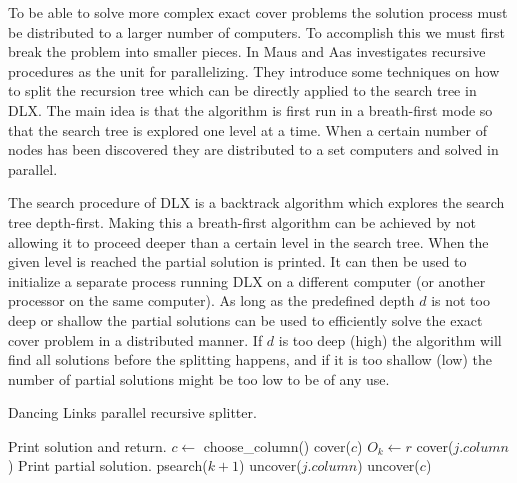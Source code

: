 To be able to solve more complex exact cover problems the solution process must be distributed to a larger number of computers.
To accomplish this we must first break the problem into smaller pieces.
In \cite{maus-prp} Maus and Aas investigates recursive procedures as the unit for parallelizing.
They introduce some techniques on how to split the recursion tree which can be directly applied to the search tree in DLX.
The main idea is that the algorithm is first run in a breath-first mode so that the search tree is explored one level at a time.
When a certain number of nodes has been discovered they are distributed to a set computers and solved in parallel.

The search procedure of DLX is a backtrack algorithm which explores the search tree depth-first.
Making this a breath-first algorithm can be achieved by not allowing it to proceed deeper than a certain level in the search tree.
When the given level is reached the partial solution is printed.
It can then be used to initialize a separate process running DLX on a different computer (or another processor on the same computer).
As long as the predefined depth $d$ is not too deep or shallow the partial solutions can be used to efficiently solve the exact cover problem in a distributed manner.
If $d$ is too deep (high) the algorithm will find all solutions before the splitting happens, and if it is too shallow (low) the number of partial solutions might be too low to be of any use.
\begin{algorithm}[H]
	\caption{Dancing Links parallel recursive splitter.}
	\label{dlx_dsearch}
	\begin{distribalgo}[1]
				\STATE Print solution and return.  
			\ENDIF
			\STATE $c \leftarrow$ choose\_column()
			\STATE cover($c$)
				\STATE $O_k \leftarrow r$  
					\STATE cover($j.column$)
				\ENDFOR
					\STATE Print partial solution.
				\ELSE
					\STATE psearch($k + 1$)
				\ENDIF
					\STATE uncover($j.column$)
				\ENDFOR
			\ENDFOR
			\STATE uncover($c$)
		\ENDPROC
	\end{distribalgo}
\end{algorithm}

